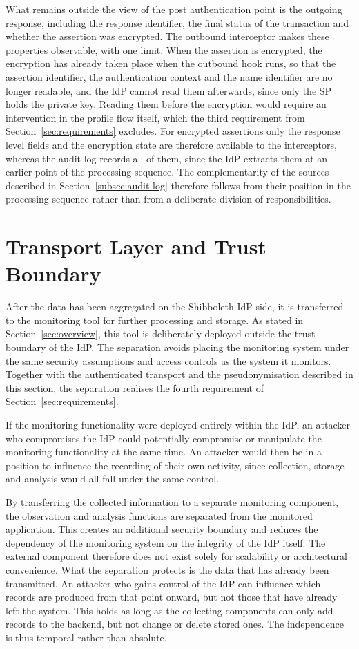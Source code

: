 \documentclass[../main.tex]{subfiles}
\begin{document}
What remains outside the view of the post authentication point is the outgoing response, including 
the response identifier, the final status of the transaction and whether the assertion was encrypted. 
The outbound interceptor makes these properties observable, with one limit. 
When the assertion is encrypted, the encryption has already taken place when the outbound hook 
runs, so that the assertion identifier, the authentication context and the name identifier are no 
longer readable, and the IdP cannot read them afterwards, since only the SP holds the private key. 
Reading them before the encryption would require an intervention in the profile flow itself, which 
the third requirement from Section~\ref{sec:requirements} excludes. 
For encrypted assertions only the response level fields and the encryption state are therefore 
available to the interceptors, whereas the audit log records all of them, since the IdP extracts 
them at an earlier point of the processing sequence. 
The complementarity of the sources described in Section~\ref{subsec:audit-log} therefore follows 
from their position in the processing sequence rather than from a deliberate division of 
responsibilities.

\section{Transport Layer and Trust Boundary}\label{sec:trust}

After the data has been aggregated on the Shibboleth IdP side, it is transferred to the 
monitoring tool for further processing and storage. 
As stated in Section~\ref{sec:overview}, this tool is deliberately deployed outside the 
trust boundary of the IdP. 
The separation avoids placing the monitoring system under the same security assumptions 
and access controls as the system it monitors. 
Together with the authenticated transport and the pseudonymisation described in this section, the 
separation realises the fourth requirement of Section~\ref{sec:requirements}. 

If the monitoring functionality were deployed entirely within the IdP, an attacker who compromises 
the IdP could potentially compromise or manipulate the monitoring functionality at the same time. 
An attacker would then be in a position to influence the recording of their own activity, 
since collection, storage and analysis would all fall under the same control. 

By transferring the collected information to a separate monitoring component, the observation 
and analysis functions are separated from the monitored application. 
This creates an additional security boundary and reduces the dependency of the monitoring system 
on the integrity of the IdP itself.
The external component therefore does not exist solely for scalability or architectural 
convenience. 
What the separation protects is the data that has already been transmitted. 
An attacker who gains control of the IdP can influence which records are produced from that point 
onward, but not those that have already left the system. 
This holds as long as the collecting components can only add records to the backend, but not 
change or delete stored ones. 
The independence is thus temporal rather than absolute. 
\end{document}
